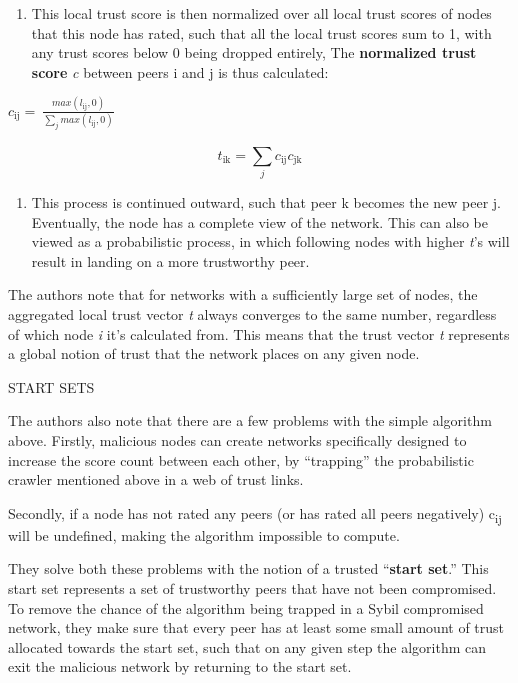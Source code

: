 \begin{enumerate}
\def\labelenumi{\arabic{enumi}.}
\item
  This local trust score is then normalized over all local trust scores
  of nodes that this node has rated, such that all the local trust
  scores sum to 1, with any trust scores below 0 being dropped entirely,
  The \textbf{normalized trust score} \emph{c} between peers i and j is
  thus calculated:
\end{enumerate}

\(c_{\text{ij}} = \ \frac{max(l_{\text{ij}},0)}{\sum_{j}^{}{max(l_{\text{ij}},0)}}\)

\[t_{\text{ik}} = \sum_{j}^{}{c_{\text{ij}}c_{\text{jk}}}\]

\begin{enumerate}
\def\labelenumi{\arabic{enumi}.}
\item
  This process is continued outward, such that peer k becomes the new
  peer j. Eventually, the node has a complete view of the network. This
  can also be viewed as a probabilistic process, in which following
  nodes with higher \emph{t}'s will result in landing on a more
  trustworthy peer.
\end{enumerate}

The authors note that for networks with a sufficiently large set of
nodes, the aggregated local trust vector \emph{t} always converges to
the same number, regardless of which node \emph{i} it's calculated from.
This means that the trust vector \emph{t} represents a global notion of
trust that the network places on any given node.

START SETS

The authors also note that there are a few problems with the simple
algorithm above. Firstly, malicious nodes can create networks
specifically designed to increase the score count between each other, by
``trapping'' the probabilistic crawler mentioned above in a web of trust
links.

Secondly, if a node has not rated any peers (or has rated all peers
negatively) c\textsubscript{ij} will be undefined, making the algorithm
impossible to compute.

They solve both these problems with the notion of a trusted
``\textbf{start set}.'' This start set represents a set of trustworthy
peers that have not been compromised. To remove the chance of the
algorithm being trapped in a Sybil compromised network, they make sure
that every peer has at least some small amount of trust allocated
towards the start set, such that on any given step the algorithm can
exit the malicious network by returning to the start set.


